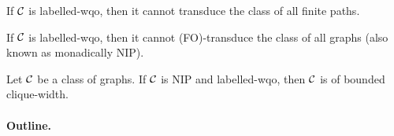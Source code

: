 \begin{remark}
    \label{transductions-paths:rem}
    If $\mathcal{C}$ is labelled-wqo, then it cannot transduce
    the class of all finite paths.
\end{remark}

\begin{remark}
    If $\mathcal{C}$ is labelled-wqo, then it cannot (FO)-transduce 
    the class of all graphs (also known as monadically NIP).
\end{remark}

\begin{conjecture}
    \label{nip-cw:conj}
    Let $\mathcal{C}$ be a class of graphs.
    If $\mathcal{C}$ is NIP and labelled-wqo,
    then $\mathcal{C}$ is of bounded clique-width.
\end{conjecture}

\paragraph*{Outline.}
